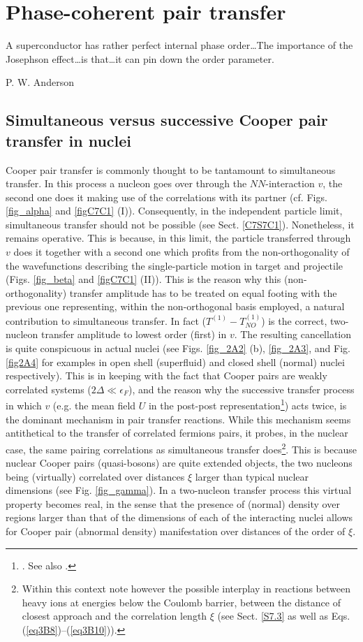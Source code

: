 \chapter{Phase-coherent pair transfer}\label{chapter2}
 \epigraph{A superconductor has rather perfect internal phase order\dots The importance of the Josephson effect\dots is that\dots it can pin down the order parameter.}{P. W. Anderson}
\section{Simultaneous versus successive Cooper pair transfer in nuclei}\label{C2S1}
Cooper pair transfer is commonly thought to be tantamount to simultaneous transfer. In this process a nucleon goes over through the $NN$-interaction $v$, the second one does it making use of the correlations with its partner (cf. Figs. \ref{fig_alpha} and \ref{figC7C1} (I)). Consequently, in the independent particle limit, simultaneous  transfer should not be possible (see Sect. \ref{C7S7C1}). Nonetheless, it remains operative. This is because, in this limit, the particle transferred through $v$ does it together with a second one which profits from the non-orthogonality of the wavefunctions describing the single-particle motion in target and projectile (Figs. \ref{fig_beta} and \ref{figC7C1} (II)). This is the reason why this (non-orthogonality) transfer amplitude has to be treated on equal footing with  the previous one  representing, within the non-orthogonal basis employed, a natural contribution to simultaneous transfer. In fact ($T^{(1)}-T^{(1)}_{NO}$) is the correct,  two-nucleon transfer amplitude to lowest order (first) in $v$. The resulting cancellation is quite conspicuous in actual nuclei  (see Figs. \ref{fig_2A2} (b), \ref{fig_2A3}, and Fig. \ref{fig2A4} for examples in open shell (superfluid) and closed shell (normal) nuclei respectively). This is in keeping with the fact that Cooper pairs are weakly correlated systems ($2\Delta\ll\epsilon_F$), and the reason why the successive transfer process in which $v$ (e.g.  the mean field $U$ in the post-post representation\footnote{\cite{Bayman:82,Potel:13}.  See also \cite{Pinkston:82}.}) acts twice, is the dominant mechanism in pair transfer reactions. While this mechanism seems antithetical to the transfer of  correlated fermions pairs, it probes, in the nuclear case, the same pairing correlations as simultaneous transfer does\footnote{Within this context note however the possible interplay in reactions between heavy ions at energies below the Coulomb barrier, between the distance of closest approach and the correlation length $\xi$ (see Sect. \ref{S7.3} as well as Eqs. (\ref{eq3B8})--(\ref{eq3B10})).}. This is because nuclear Cooper pairs (quasi-bosons) are quite extended objects, the two nucleons being (virtually) correlated over distances $\xi$  larger than typical nuclear dimensions (see Fig. \ref{fig_gamma}). In a two-nucleon transfer process this virtual property becomes real, in the sense that the presence of (normal) density over regions larger than that of the dimensions of each of the interacting nuclei allows for  Cooper pair (abnormal density) manifestation over distances of the order of $\xi$.



